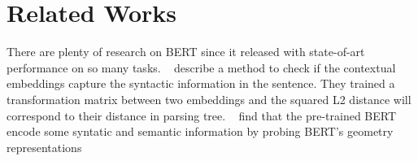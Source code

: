 \section{Related Works}

There are plenty of research on BERT since it released with state-of-art performance on so many tasks.
~\cite{devlin2018bert} describe a method to check if the contextual embeddings capture the syntactic information in the sentence. They trained a transformation matrix between two embeddings and the squared L2 distance will correspond to their distance in parsing tree.
~\cite{coenen2019visualizing} find that the pre-trained BERT encode some syntatic and semantic information by probing BERT's geometry representations